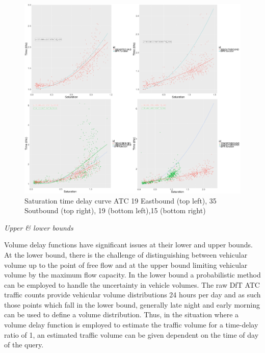 \documentclass{CUP-JNL-DCE}
\begin{document}
\begin{figure}[htbp!] 
	\centering    
	\includegraphics[width=1.0\textwidth]{Picture26}
	\caption[Saturation time delay curve ATC 19 Eastbound (top left), 35 Soutbound (top right), 19 (bottom left),15 (bottom right)]{Saturation time delay curve ATC 19 Eastbound (top left), 35 Soutbound (top right), 19 (bottom left),15 (bottom right)}
	\label{fig:Picture3.26}
\end{figure}

\vspace{5mm}
\textit{Upper \& lower bounds}
\vspace{5mm}

Volume delay functions have significant issues at their lower and upper bounds. At the lower bound, there is the challenge of distinguishing between vehicular volume up to the point of free flow and at the upper bound limiting vehicular volume by the maximum flow capacity. 
In the lower bound a probabilistic method can be employed to handle the uncertainty in vehicle volumes. The raw DfT ATC traffic counts provide vehicular volume distributions 24 hours per day and as such those points which fall in the lower bound, generally late night and early morning can be used to define a volume distribution. Thus, in the situation where a volume delay function is employed to estimate the traffic volume for a time-delay ratio of 1, an estimated traffic volume can be given dependent on the time of day of the query.
\end{document}
